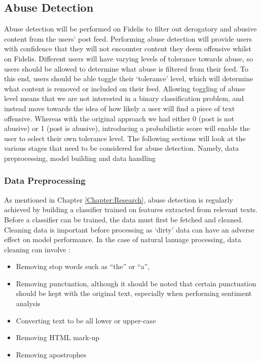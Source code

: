 \subsection{Abuse Detection}
\label{sec:abuse-detection}
Abuse detection will be performed on Fidelis to filter out derogatory and abusive content from the users' post feed. Performing abuse detection will provide users with confidence that they will not encounter content they deem offensive whilst on Fidelis. Different users will have varying levels of tolerance towards abuse, so users should be allowed to determine what abuse is filtered from their feed. To this end, users should be able toggle their `tolerance' level, which will determine what content is removed or included on their feed. Allowing toggling of abuse level means that we are not interested in a binary classification problem, and instead move towards the idea of how likely a user will find a piece of text offensive. Whereas with the original approach we had either 0 (post is not abusive) or 1 (post is abusive), introducing a probabilistic score will enable the user to select their own tolerance level. The following sections will look at the various stages that need to be considered for abuse detection. Namely, data preprocessing, model building and data handling

\subsubsection{Data Preprocessing}
As mentioned in Chapter \ref{Chapter:Research}, abuse detection is regularly achieved by building a classifier trained on features extracted from relevant texts. Before a classifier can be trained, the data must first be fetched and cleaned. Cleaning data is important before processing as `dirty' data can have an adverse effect on model performance. In the case of natural lanuage processing, data cleaning can involve \cite{han2011data}:
\begin{itemize}
\item Removing stop words such as ``the'' or ``a'', 
\item Removing punctuation, although it should be noted that certain punctuation should be kept with the original text, especially when performing sentiment analysis
\item Converting text to be all lower or upper-case
\item Removing HTML mark-up
\item Removing apostrophes
\end{itemize}

